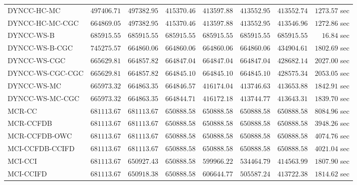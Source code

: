 \begin{table}[H]
\begin{tabular}{lrrrrrrr}
         DYNCC-HC-MC & $    497406.71$ & $    497382.95$ & $    415370.46$ & $    413597.88$ & $    413552.95$ & $    413552.74$ & $      1273.57$ sec   \\ 
     DYNCC-HC-MC-CGC & $    664869.05$ & $    497382.95$ & $    415370.46$ & $    413597.88$ & $    413552.95$ & $    413546.96$ & $      1272.86$ sec   \\ 
          DYNCC-WS-B & $    685915.55$ & $    685915.55$ & $    685915.55$ & $    685915.55$ & $    685915.55$ & $    685915.55$ & $        16.84$ sec   \\ 
      DYNCC-WS-B-CGC & $    745275.57$ & $    664860.06$ & $    664860.06$ & $    664860.06$ & $    664860.06$ & $    434904.61$ & $      1802.69$ sec   \\ 
        DYNCC-WS-CGC & $    665629.81$ & $    664857.82$ & $    664847.04$ & $    664847.04$ & $    664847.04$ & $    428682.14$ & $      2027.00$ sec   \\ 
    DYNCC-WS-CGC-CGC & $    665629.81$ & $    664857.82$ & $    664845.10$ & $    664845.10$ & $    664845.10$ & $    428575.34$ & $      2053.05$ sec   \\ 
         DYNCC-WS-MC & $    665973.32$ & $    664863.35$ & $    664846.57$ & $    416174.04$ & $    413746.63$ & $    413653.88$ & $      1842.91$ sec   \\ 
     DYNCC-WS-MC-CGC & $    665973.32$ & $    664863.35$ & $    664844.71$ & $    416172.18$ & $    413744.77$ & $    413643.31$ & $      1839.70$ sec   \\ 
\cmidrule{1-1} 
              MCR-CC & $    681113.67$ & $    681113.67$ & $    650888.58$ & $    650888.58$ & $    650888.58$ & $    650888.58$ & $      8084.96$ sec   \\ 
           MCR-CCFDB & $    681113.67$ & $    681113.67$ & $    650888.58$ & $    650888.58$ & $    650888.58$ & $    650888.58$ & $      3948.26$ sec   \\ 
       MCR-CCFDB-OWC & $    681113.67$ & $    681113.67$ & $    650888.58$ & $    650888.58$ & $    650888.58$ & $    650888.58$ & $      4074.76$ sec   \\ 
\cmidrule{1-1} 
     MCI-CCFDB-CCIFD & $    681113.67$ & $    681113.67$ & $    650888.58$ & $    650888.58$ & $    650888.58$ & $    650888.58$ & $      4021.04$ sec   \\ 
             MCI-CCI & $    681113.67$ & $    650927.43$ & $    650888.58$ & $    599966.22$ & $    534464.79$ & $    414563.99$ & $      1807.90$ sec   \\ 
           MCI-CCIFD & $    681113.67$ & $    650918.38$ & $    650888.58$ & $    606644.77$ & $    505587.24$ & $    413722.38$ & $      1814.62$ sec   \\ 
\bottomrule
\end{tabular}
\end{table}

